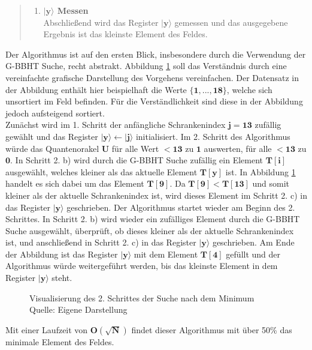 \begin{quote}
\begin{enumerate}
        \item \textbf{$\mathbf{|y\rangle}$ Messen}
        \\
        Abschließend wird das Register $\mathbf{|y\rangle}$ gemessen und das ausgegebene Ergebnis ist das kleinste Element des Feldes.
    \end{enumerate}
\end{quote}

Der Algorithmus ist auf den ersten Blick, insbesondere durch die Verwendung der G-BBHT Suche, recht abstrakt. 
Abbildung \ref{fig:sucheMinimumVisualisierung} soll das Verständnis durch eine vereinfachte grafische Darstellung des Vorgehens vereinfachen. 
Der Datensatz in der Abbildung enthält hier beispielhaft die Werte $\mathbf{\{1, ..., 18\}}$, welche sich unsortiert im Feld befinden. Für die Verständlichkeit sind diese in der Abbildung jedoch aufsteigend sortiert.
\\
Zunächst wird im 1. Schritt der anfängliche Schrankenindex $\mathbf{j = 13}$ zufällig gewählt und das Register $\mathbf{|y\rangle \leftarrow |j\rangle}$ initialisiert. 
Im 2. Schritt des Algorithmus würde das Quantenorakel $\mathbf{U}$ für alle Wert $\mathbf{< 13}$ zu $\mathbf{1}$ auswerten, für alle $\mathbf{< 13}$ zu $\mathbf{0}$.
In Schritt 2. b) wird durch die G-BBHT Suche zufällig ein Element $\mathbf{T[i]}$ ausgewählt, welches kleiner als das aktuelle Element $\mathbf{T[y]}$ ist. 
In Abbildung \ref{fig:sucheMinimumVisualisierung} handelt es sich dabei um das Element $\mathbf{T[9]}$.
Da $\mathbf{T[9] < T[13]}$ und somit kleiner als der aktuelle Schrankenindex ist, wird dieses Element im Schritt 2. c) in das Register $\mathbf{|y\rangle}$ geschrieben.
Der Algorithmus startet wieder am Beginn des 2. Schrittes. In Schritt 2. b) wird wieder ein zufälliges Element durch die G-BBHT Suche ausgewählt, überprüft, ob dieses kleiner als der aktuelle Schrankenindex ist, und anschließend in Schritt 2. c) in das Register $\mathbf{|y\rangle}$ geschrieben.
Am Ende der Abbildung ist das Register $\mathbf{|y\rangle}$ mit dem Element $\mathbf{T[4]}$ gefüllt und der Algorithmus würde weitergeführt werden, bis das kleinste Element in dem Register $\mathbf{|y\rangle}$ steht.
\begin{figure}[hbtp]
	\centering
	\caption{Visualisierung des 2. Schrittes der Suche nach dem Minimum \\ Quelle: Eigene Darstellung}
	\label{fig:sucheMinimumVisualisierung}
\end{figure} 

Mit einer Laufzeit von $\mathbf{O(\sqrt{N})}$ findet dieser Algorithmus mit über 50\% das minimale Element des Feldes.
